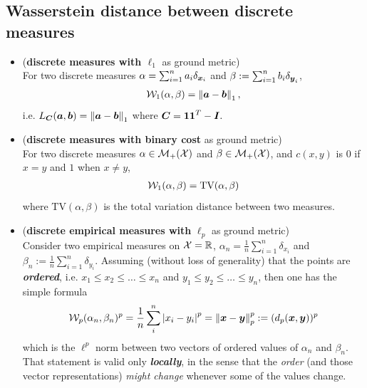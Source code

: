 \documentclass[11pt]{article}
\begin{document}
\subsection{Wasserstein distance between discrete measures}
\begin{itemize}
\item (\textbf{discrete measures with $\ell_1$} as ground metric)\\
For two discrete measures $\alpha = \sum_{i=1}^{n}a_i \delta_{\boldsymbol{x}_{i}}$ and $\beta := \sum_{i=1}^{n}b_i \delta_{\boldsymbol{y}_{i}}$,  
\begin{align}
{\mathcal W}_{1}(\alpha, \beta) = \left\|\boldsymbol{a} - \boldsymbol{b}\right\|_{1},  \label{eqn: wass_dist_l1_discrete}
\end{align} i.e. $L_{\boldsymbol{C}}(\boldsymbol{a}, \boldsymbol{b})= \left\|\boldsymbol{a} - \boldsymbol{b}\right\|_{1}$ where $\boldsymbol{C} = \boldsymbol{1}\boldsymbol{1}^{T} - \boldsymbol{I}.$

\item (\textbf{discrete measures with binary cost} as ground metric)\\
For two discrete measures $\alpha \in {\mathcal M}_{+}({\mathcal X})$ and $\beta \in {\mathcal M}_{+}({\mathcal X})$, and $c(x, y)$ is $0$ if $x = y$ and $1$ when $x \neq y$, 
\begin{align*}
{\mathcal W}_{1}(\alpha, \beta) = \text{TV}(\alpha, \beta)
\end{align*} where $\text{TV}(\alpha, \beta)$ is the total variation distance between two measures.

\item (\textbf{discrete empirical measures with }$\ell_p$ as ground metric)\\
Consider two empirical measures on ${\mathcal X} = {\mathbb R}$, $\alpha_{n} = \frac{1}{n}\sum_{i=1}^{n}\delta_{x_{i}}$ and $\beta_{n} := \frac{1}{n}\sum_{i=1}^{n}\delta_{y_{i}}$. Assuming (without loss of generality) that the points are \emph{\textbf{ordered}}, i.e. $x_1 \le x_2 \le \ldots \le x_n$ and $y_1 \le y_2 \le  \ldots  \le y_n$, then one has the simple formula
\begin{align}
{\mathcal W}_{p}(\alpha_{n}, \beta_{n})^{p} =\frac{1}{n} \sum_{i}^{n}\left\lvert x_i - y_i \right\rvert^{p} = \left\|\boldsymbol{x}- \boldsymbol{y}\right\|_{p}^{p} := (d_{p}(\boldsymbol{x}, \boldsymbol{y}))^{p} \label{eqn: wass_dist_lp_discrete}
\end{align} which is the $\ell^{p}$ norm between two vectors of ordered values of $\alpha_n$ and $\beta_n$. That statement is valid only \emph{\textbf{locally}}, in the
sense that the \emph{order} (and those vector representations) \emph{might change} whenever some of the values change. 
\end{itemize}
\end{document}
